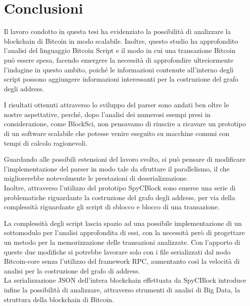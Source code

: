\chapter{Conclusioni}\label{chap:conclusioni}

Il lavoro condotto in questa tesi ha evidenziato  la possibilità di analizzare la blockchain di Bitcoin in modo scalabile. Inoltre, questo studio ha approfondito l'analisi del linguaggio Bitcoin Script e il modo in cui una transazione Bitcoin può essere spesa, facendo emergere la necessità di approfondire ultreiormente l'indagine in questo ambito, poiché le informazioni contenute all'interno degli script possono aggiungere informazioni interessanti per la costruzione del grafo degli address.

I risultati ottenuti attraverso lo sviluppo del parser sono andati ben oltre le nostre aspettative, perché, dopo l'analisi dei numerosi esempi presi in considerazione, come BlockSci, non pensavamo di riuscire a ricavare un prototipo di un software scalabile che potesse venire eseguito su macchine comuni con tempi di calcolo ragionevoli.

Guardando alle possibili estensioni del lavoro svolto, si può pensare di modificare l'implementazione del parser in modo tale da sfruttare il parallelismo, il che  migliorerebbe notevolmente le prestazioni di deserializzazione.\\
Inoltre, attraverso l'utilizzo del prototipo SpyCBlock sono emerse una serie di problematiche riguardante la costruzione del grafo degli address, per via della complessità riguardante gli script di sblocco e blocco di una transazione.

La complessità degli script lascia spazio ad una possibile implementazione di un sottomodulo per l'analisi approfondita di essi, con la necessità però di progettare un metodo per la memorizzazione delle transazioni analizzate. Con l'apporto di queste due modifiche si potrebbe lavorare solo con i file serializzati dal nodo Bitcoin-core senza l'utilizzo del framework RPC, aumentanto così la velocità di analisi per la costruzione del grafo di address.\\
La serializzazione JSON dell'intera blockchain effettuata da SpyCBlock introduce infine la  possibilità di analizzare, attraverso strumenti di analisi di Big Data, la struttura della blockchain di Bitcoin.
